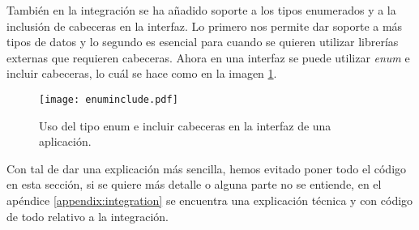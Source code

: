 También en la integración se ha añadido soporte a los tipos enumerados y a la inclusión de cabeceras en la interfaz. Lo primero nos permite dar soporte a más tipos de datos y lo segundo es esencial para cuando se quieren utilizar librerías externas que requieren cabeceras. Ahora en una interfaz se puede utilizar \textit{enum} e incluir cabeceras, lo cuál se hace como en la imagen \ref{fig:enuminclude}.

\par\bigskip

\begin{figure}[h]
	\centering 
	\caption{Uso del tipo enum e incluir cabeceras en la interfaz de una aplicación.}
	\texttt{[image: enuminclude.pdf]}
	\label{fig:enuminclude}
\end{figure}


\par\bigskip

Con tal de dar una explicación más sencilla, hemos evitado poner todo el código en esta sección, si se quiere más detalle o alguna parte no se entiende, en el apéndice \ref{appendix:integration} se encuentra una explicación técnica y con código de todo relativo a la integración.